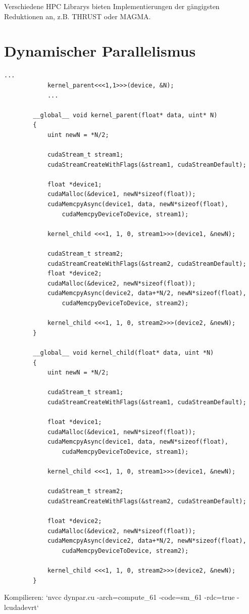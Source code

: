 		Verschiedene HPC Librarys bieten Implementierungen der gängigsten Reduktionen an, z.B. THRUST oder MAGMA. 
		
		\section{Dynamischer Parallelismus}\label{dyn}
		\begin{lstlisting}[caption=Dynamischer Parallelismus]
			...
  			kernel_parent<<<1,1>>>(device, &N);
			...
			
		__global__ void kernel_parent(float* data, uint* N)
		{
  			uint newN = *N/2;
  
			cudaStream_t stream1; 
			cudaStreamCreateWithFlags(&stream1, cudaStreamDefault);
  
			float *device1;
			cudaMalloc(&device1, newN*sizeof(float));
			cudaMemcpyAsync(device1, data, newN*sizeof(float), 
				cudaMemcpyDeviceToDevice, stream1);
  
			kernel_child <<<1, 1, 0, stream1>>>(device1, &newN);
  
			cudaStream_t stream2; 
			cudaStreamCreateWithFlags(&stream2, cudaStreamDefault);
			float *device2;
			cudaMalloc(&device2, newN*sizeof(float));
			cudaMemcpyAsync(device2, data+*N/2, newN*sizeof(float), 
				cudaMemcpyDeviceToDevice, stream2);
  
			kernel_child <<<1, 1, 0, stream2>>>(device2, &newN);
		}

		__global__ void kernel_child(float* data, uint *N)
		{
			uint newN = *N/2;
  
			cudaStream_t stream1; 
			cudaStreamCreateWithFlags(&stream1, cudaStreamDefault);
			
			float *device1;
			cudaMalloc(&device1, newN*sizeof(float));
			cudaMemcpyAsync(device1, data, newN*sizeof(float), 
				cudaMemcpyDeviceToDevice, stream1);
  
			kernel_child <<<1, 1, 0, stream1>>>(device1, &newN);
  
			cudaStream_t stream2; 
			cudaStreamCreateWithFlags(&stream2, cudaStreamDefault);
			
			float *device2;
			cudaMalloc(&device2, newN*sizeof(float));
			cudaMemcpyAsync(device2, data+*N/2, newN*sizeof(float), 
				cudaMemcpyDeviceToDevice, stream2);
  
			kernel_child <<<1, 1, 0, stream2>>>(device2, &newN);
		}
		\end{lstlisting}
		
		Kompilieren: \li`nvcc dynpar.cu -arch=compute_61 -code=sm_61 -rdc=true -lcudadevrt`
		
